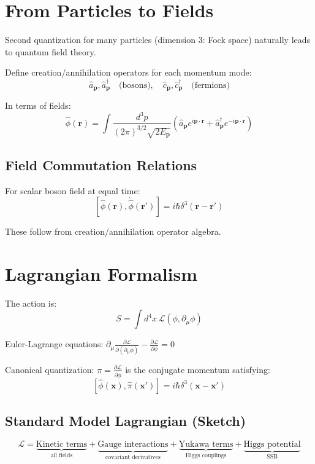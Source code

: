 \documentclass[12pt,openany,oneside]{book}
\begin{document}
{{{\section{From Particles to Fields}

Second quantization for many particles (dimension 3: Fock space) naturally leads to quantum field theory.

Define creation/annihilation operators for each momentum mode:
\[
\hat{a}_\mathbf{p}, \hat{a}_\mathbf{p}^\dagger \quad \text{(bosons)}, \quad \hat{c}_\mathbf{p}, \hat{c}_\mathbf{p}^\dagger \quad \text{(fermions)}
\]

In terms of fields:
\[
\hat{\phi}(\mathbf{r}) = \int \frac{d^3p}{(2\pi)^{3/2}\sqrt{2E_\mathbf{p}}}(\hat{a}_\mathbf{p}e^{i\mathbf{p} \cdot \mathbf{r}} + \hat{a}_\mathbf{p}^\dagger e^{-i\mathbf{p} \cdot \mathbf{r}})
\]

\subsection{Field Commutation Relations}

For scalar boson field at equal time:
\[
[\hat{\phi}(\mathbf{r}), \dot{\hat{\phi}}(\mathbf{r}')] = i\hbar\delta^3(\mathbf{r} - \mathbf{r}')
\]

These follow from creation/annihilation operator algebra.

\section{Lagrangian Formalism}

The action is:
\[
S = \int d^4x \, \mathcal{L}(\phi, \partial_\mu\phi)
\]

Euler-Lagrange equations: $\partial_\mu\frac{\partial\mathcal{L}}{\partial(\partial_\mu\phi)} - \frac{\partial\mathcal{L}}{\partial\phi} = 0$

Canonical quantization: $\pi = \frac{\partial\mathcal{L}}{\partial\dot{\phi}}$ is the conjugate momentum satisfying:
\[
[\hat{\phi}(\mathbf{x}), \hat{\pi}(\mathbf{x}')] = i\hbar\delta^3(\mathbf{x} - \mathbf{x}')
\]

\subsection{Standard Model Lagrangian (Sketch)}

\[
\mathcal{L} = \underbrace{\text{Kinetic terms}}_{\text{all fields}} + \underbrace{\text{Gauge interactions}}_{\text{covariant derivatives}} + \underbrace{\text{Yukawa terms}}_{\text{Higgs couplings}} + \underbrace{\text{Higgs potential}}_{\text{SSB}}
\]

}}}
\end{document}
